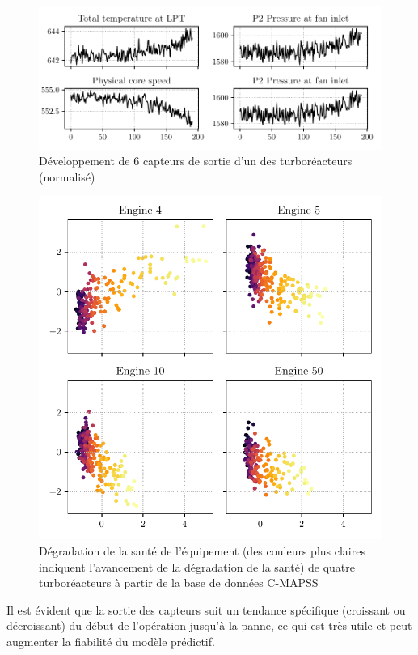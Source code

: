 \begin{figure}[h]
    \centering
    \includegraphics[width=\linewidth]{figures/sensors_plot.pdf}
    \caption{Développement de 6 capteurs de sortie d'un des turboréacteurs (normalisé)}
    \label{fig:sensors-plot}
\end{figure}
\begin{figure}[H]
    \centering
    \includegraphics[width=.9\linewidth]{figures/pca-degradation.pdf}
    \caption{Dégradation de la santé de l'équipement (des couleurs plus claires indiquent l'avancement de la dégradation de la santé) de quatre turboréacteurs à partir de la base de données C-MAPSS}
    \label{fig:pca-degradation}
\end{figure}

Il est évident que la sortie des capteurs suit un tendance spécifique (croissant ou décroissant) du début de l'opération jusqu'à la panne, ce qui est très utile et peut augmenter la fiabilité du modèle prédictif.

